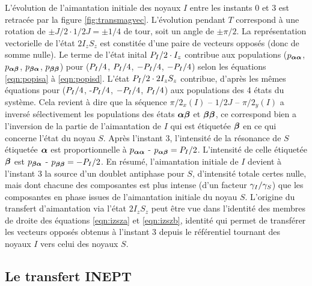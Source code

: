 L'évolution de l'aimantation initiale des noyaux $I$ entre les
instants 0 et 3 est retracée par la figure \ref{fig:transmagvec}.
L'évolution pendant $T$ correspond à une rotation de 
$\pm J/2 \cdot 1/2J = \pm1/4$ de tour, soit un angle de $\pm \pi/2$.
La représentation vectorielle de l'état $2I_zS_z$ est constitée d'une paire
de vecteurs opposés (donc de somme nulle).
Le terme de l'état inital $P_{I}/2 \cdot I_z$ contribue aux populations
($p_{\boldsymbol{\alpha}\boldsymbol{\alpha}}$, $p_{\boldsymbol{\alpha}\boldsymbol{\beta}}$, $p_{\boldsymbol{\beta}\boldsymbol{\alpha}}$, $p_{\boldsymbol{\beta}\boldsymbol{\beta}}$) pour 
($P_{I}/4$, $P_{I}/4$, $-P_{I}/4$, $-P_{I}/4$) selon les équations
\ref{eqn:popisa} à \ref{eqn:popisd}.
L'état $P_{I}/2 \cdot 2I_zS_z$ contribue, d'après les mêmes équations
pour ($P_{I}/4$, -$P_{I}/4$, $-P_{I}/4$, $P_{I}/4$) 
aux populations des 4 états du système.
Cela revient à dire que la séquence $\pi/2_x(I)$ -- $1/2J$ -- $\pi/2_y(I)$
a inversé sélectivement les populations
des états $\boldsymbol{\alpha}\boldsymbol{\beta}$ et $\boldsymbol{\beta}\boldsymbol{\beta}$, ce correspond bien a l'inversion
de la partie de l'aimantation de $I$ qui est étiquetée $\boldsymbol{\beta}$ en
ce qui concerne l'état du noyau $S$.
Après l'instant 3, l'intensité de la résonance de $S$ étiquetée $\boldsymbol{\alpha}$
est proportionnelle à $p_{\boldsymbol{\alpha}\boldsymbol{\alpha}}$ - $p_{\boldsymbol{\alpha}\boldsymbol{\beta}} = P_{I}/2$.
L'intensité de celle étiquetée $\boldsymbol{\beta}$ est $p_{\boldsymbol{\beta}\boldsymbol{\alpha}}$ - $p_{\boldsymbol{\beta}\boldsymbol{\beta}} = -P_{I}/2$.
En résumé, l'aimantation initiale de $I$ devient à l'instant 3 la source
d'un doublet antiphase pour $S$, d'intensité totale certes nulle, mais dont
chacune des composantes est plus intense (d'un facteur $\gamma_I/\gamma_S$) que
les composantes en phase issues de l'aimantation initiale du noyau $S$.
L'origine du transfert d'aimantation via l'état $2I_zS_z$
peut être vue dans l'identité des membres de droite des équations
\ref{eqn:izsza} et \ref{eqn:izszb}, identité qui permet de transférer les vecteurs
opposés obtenus à l'instant 3 depuis le référentiel tournant des noyaux
$I$ vers celui des noyaux $S$.

\subsection{Le transfert INEPT}

